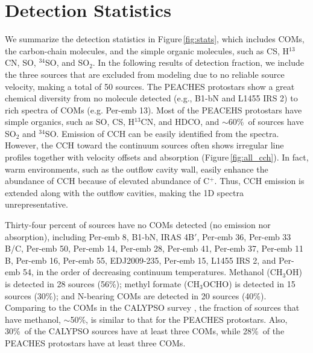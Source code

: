 \documentclass[twocolumn]{aastex62}
\newcommand{\htcn}{\mbox{H$^{13}$CN}}
\newcommand{\methylformate}{\mbox{CH$_{3}$OCHO}}
\newcommand{\methanol}{\mbox{CH$_{3}$OH}}
\begin{document}

\section{Detection Statistics}
We summarize the detection statistics in Figure\,\ref{fig:stats}, which includes COMs, the carbon-chain molecules, and the simple organic molecules, such as CS, \htcn, SO, $^{34}$SO, and SO$_{2}$.  In the following results of detection fraction, we include the three sources that are excluded from modeling due to no reliable source velocity, making a total of 50 sources.  The PEACHES protostars show a great chemical diversity from no molecule detected (e.g., B1-bN and L1455 IRS 2) to rich spectra of COMs (e.g. Per-emb 13).  Most of the PEACEHS protostars have simple organics, such as SO, CS, \htcn, and HDCO, and $\sim 60$\%\ of sources have SO$_{2}$ and $^{34}$SO.  Emission of CCH can be easily identified from the spectra.  However, the CCH toward the continuum sources often shows irregular line profiles together with velocity offsets and absorption (Figure\,\ref{fig:all_cch}).  In fact, warm environments, such as the outflow cavity wall, easily enhance the abundance of CCH because of elevated abundance of C$^{+}$.  Thus, CCH emission is extended along with the outflow cavities, making the 1D spectra unrepresentative.

Thirty-four percent of sources have no COMs detected (no emission nor absorption), including Per-emb 8, B1-bN, IRAS 4B$\prime$, Per-emb 36, Per-emb 33 B/C, Per-emb 50, Per-emb 14, Per-emb 28, Per-emb 41, Per-emb 37, Per-emb 11 B, Per-emb 16, Per-emb 55, EDJ2009-235, Per-emb 15, L1455 IRS 2, and Per-emb 54, in the order of decreasing continuum temperatures.  Methanol (\methanol) is detected in 28 sources (56\%); methyl formate (\methylformate) is detected in 15 sources (30\%); and N-bearing COMs are detected in 20 sources (40\%).  Comparing to the COMs in the CALYPSO survey \citep{2020A&A...635A.198B}, the fraction of sources that have methanol, $\sim$50\%, is similar to that for the PEACHES protostars.  Also, 30\%\ of the CALYPSO sources have at least three COMs, while 28\%\ of the PEACHES protostars have at least three COMs.  
\end{document}
